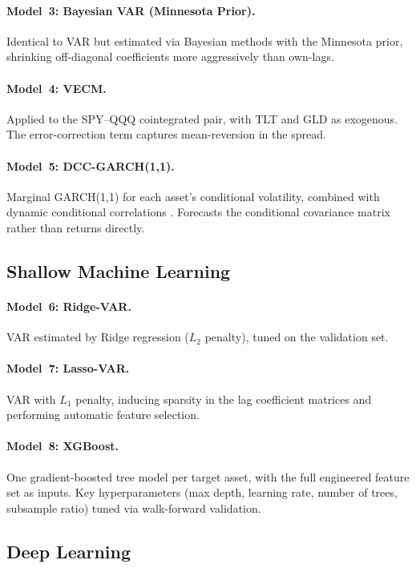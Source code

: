 \documentclass[11pt,a4paper,twocolumn]{article}
\begin{document}
\paragraph{Model~3: Bayesian VAR (Minnesota Prior).}
Identical to VAR but estimated via Bayesian methods with the Minnesota prior,
shrinking off-diagonal coefficients more aggressively than own-lags.

\paragraph{Model~4: VECM.}
Applied to the SPY--QQQ cointegrated pair, with TLT and GLD as exogenous.  The
error-correction term captures mean-reversion in the spread.

\paragraph{Model~5: DCC-GARCH(1,1).}
Marginal GARCH(1,1) for each asset's conditional volatility, combined with
dynamic conditional correlations \citep{engle2002}.  Forecasts the conditional
covariance matrix rather than returns directly.

\subsection{Shallow Machine Learning}

\paragraph{Model~6: Ridge-VAR.}
VAR estimated by Ridge regression ($L_2$ penalty), tuned on the validation set.

\paragraph{Model~7: Lasso-VAR.}
VAR with $L_1$ penalty, inducing sparsity in the lag coefficient matrices and
performing automatic feature selection.

\paragraph{Model~8: XGBoost.}
One gradient-boosted tree model per target asset, with the full engineered
feature set as inputs.  Key hyperparameters (max depth, learning rate, number of
trees, subsample ratio) tuned via walk-forward validation.

\subsection{Deep Learning}
\end{document}

